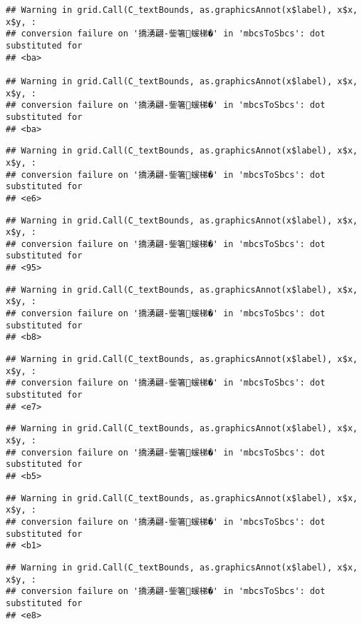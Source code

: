 \documentclass[
]{article}
\begin{document}
\begin{verbatim}
## Warning in grid.Call(C_textBounds, as.graphicsAnnot(x$label), x$x, x$y, :
## conversion failure on '撟湧翩-鈭箸蝯梯�' in 'mbcsToSbcs': dot substituted for
## <ba>

## Warning in grid.Call(C_textBounds, as.graphicsAnnot(x$label), x$x, x$y, :
## conversion failure on '撟湧翩-鈭箸蝯梯�' in 'mbcsToSbcs': dot substituted for
## <ba>
\end{verbatim}

\begin{verbatim}
## Warning in grid.Call(C_textBounds, as.graphicsAnnot(x$label), x$x, x$y, :
## conversion failure on '撟湧翩-鈭箸蝯梯�' in 'mbcsToSbcs': dot substituted for
## <e6>
\end{verbatim}

\begin{verbatim}
## Warning in grid.Call(C_textBounds, as.graphicsAnnot(x$label), x$x, x$y, :
## conversion failure on '撟湧翩-鈭箸蝯梯�' in 'mbcsToSbcs': dot substituted for
## <95>
\end{verbatim}

\begin{verbatim}
## Warning in grid.Call(C_textBounds, as.graphicsAnnot(x$label), x$x, x$y, :
## conversion failure on '撟湧翩-鈭箸蝯梯�' in 'mbcsToSbcs': dot substituted for
## <b8>
\end{verbatim}

\begin{verbatim}
## Warning in grid.Call(C_textBounds, as.graphicsAnnot(x$label), x$x, x$y, :
## conversion failure on '撟湧翩-鈭箸蝯梯�' in 'mbcsToSbcs': dot substituted for
## <e7>
\end{verbatim}

\begin{verbatim}
## Warning in grid.Call(C_textBounds, as.graphicsAnnot(x$label), x$x, x$y, :
## conversion failure on '撟湧翩-鈭箸蝯梯�' in 'mbcsToSbcs': dot substituted for
## <b5>
\end{verbatim}

\begin{verbatim}
## Warning in grid.Call(C_textBounds, as.graphicsAnnot(x$label), x$x, x$y, :
## conversion failure on '撟湧翩-鈭箸蝯梯�' in 'mbcsToSbcs': dot substituted for
## <b1>
\end{verbatim}

\begin{verbatim}
## Warning in grid.Call(C_textBounds, as.graphicsAnnot(x$label), x$x, x$y, :
## conversion failure on '撟湧翩-鈭箸蝯梯�' in 'mbcsToSbcs': dot substituted for
## <e8>
\end{verbatim}
\end{document}
